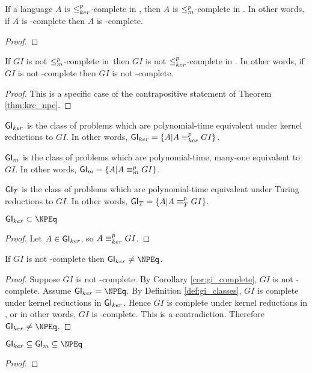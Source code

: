 \begin{theorem}\label{thm:krc_npc}If a language $A$ is $\leq^{p}_{ker}$-complete in \NPEq,
  then $A$ is $\leq^{p}_{m}$-complete in \NP. In other words, if $A$ is \NPEq-complete
  then $A$ is \NP-complete.\end{theorem}
\begin{proof}
\end{proof}

\begin{corollary}\label{cor:gi_complete}If $GI$ is not $\leq^{p}_{m}$-complete in
  \NP\,then $GI$ is not $\leq^{p}_{ker}$-complete in \NPEq. In other words, if $GI$ is not
  \NP-complete then $GI$ is not \NPEq-complete.\end{corollary}
\begin{proof}
  This is a specific case of the contrapositive statement of Theorem
  \ref{thm:krc_npc}.
\end{proof}

\begin{definition}\label{def:gi_classes}${\mathsf{GI}}_{ker}$ is the class of problems
  which are polynomial-time equivalent under kernel reductions to $GI$. In
  other words, ${\mathsf{GI}}_{ker}=\{A|A\equiv^{p}_{ker} GI\}$.

  ${\mathsf{GI}}_m$ is the class of problems which are polynomial-time, many-one
  equivalent to $GI$. In other words, ${\mathsf{GI}}_m=\{A|A\equiv^{p}_m GI\}$.

  ${\mathsf{GI}}_T$ is the class of problems which are polynomial-time equivalent under
  Turing reductions to $GI$. In other words, ${\mathsf{GI}}_T=\{A|A\equiv^{p}_T GI\}$.
\end{definition}

\begin{lemma}$\GIker\subset\NPEq$\end{lemma}
\begin{proof}Let $A\in{\ensuremath{\mathsf{GI}}}_{ker}$, so $A\equiv^{p}_{ker} GI$.\end{proof}

\begin{theorem}If $GI$ is not \NP-complete then $\GIker\neq\NPEq$.\end{theorem}
\begin{proof}
  Suppose $GI$ is not \NP-complete. By Corollary \ref{cor:gi_complete}, $GI$ is
  not \NPEq-complete. Assume $\GIker=\NPEq$. By Definition
  \ref{def:gi_classes}, $GI$ is complete under kernel reductions in
  ${\mathsf{GI}}_{ker}$. Hence $GI$ is complete under kernel reductions in \NPEq, or in
  other words, $GI$ is \NPEq-complete. This is a contradiction. Therefore
  $\GIker\neq\NPEq$.
\end{proof}


\begin{theorem}$\GIker\subseteq\GIm\subseteq\NPEq$\end{theorem}
\begin{proof}
\end{proof}
